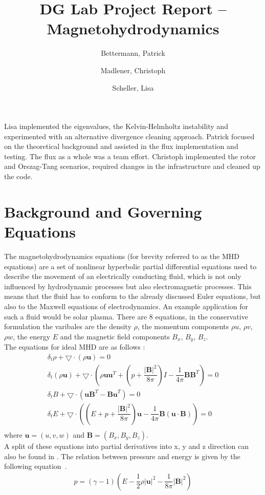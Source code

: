 \documentclass[a4paper]{article}
\author{
  Bettermann, Patrick
  \and
  Madlener, Christoph
  \and
  Scheller, Lisa
}
\title{DG Lab Project Report -- Magnetohydrodynamics}
\begin{document}
\maketitle

Lisa implemented the eigenvalues, the Kelvin-Helmholtz instability and
experimented with an alternative divergence cleaning approach. Patrick focused
on the theoretical background and assisted in the flux implementation and
testing. The flux as a whole was a team effort. Christoph implemented the rotor
and Orszag-Tang scenarios, required changes in the infrastructure and cleaned up
the code.

\section{Background and Governing Equations}
The magnetohydrodynamics equations (for brevity referred to as the MHD
equations) are a set of nonlinear hyperbolic partial differential equations used
to describe the movement of an electrically conducting fluid, which is not only
influenced by hydrodynamic processes but also electromagnetic processes. This
means that the fluid has to conform to the already discussed Euler equations,
but also to the Maxwell equations of electrodynamics. An example application for
such a fluid would be solar plasma. There are 8 equations, in the conservative
formulation the varibales are the density $\rho$, the momentum components $\rho
u$, $\rho v$, $\rho w$, the energy $E$ and the magnetic field components $B_x$,
$B_y$, $B_z$.\\
The equations for ideal MHD are as follows \cite{dedner2002hyperbolic}\cite{balsara2010multidimensional}:
\begin{align*}
\delta_t \rho + \bigtriangledown \cdot (\rho\textbf{u})= 0\\
\delta_t (\rho \textbf{u}) + \bigtriangledown \cdot (\rho     \textbf{u} \textbf{u}^T + (p + \dfrac{|\textbf{B}|^2}{8\pi})I - \dfrac{1}{4\pi}\textbf{B}\textbf{B}^T) = 0\\
\delta_t B + \bigtriangledown \cdot (\textbf{uB}^T-\textbf{Bu}^T) = 0\\
\delta_t E + \bigtriangledown \cdot ((E + p + \dfrac{|\textbf{B}|^2}{8\pi})\textbf{u} - \dfrac{1}{4\pi}\textbf{B}(\textbf{u} \cdot \textbf{B})) = 0\\
\end{align*}
where $\textbf{u} = (u, v, w)$ and $\textbf{B} = (B_x, B_y, B_z)$.\\
A split of these equations into partial derivatives into x, y and z direction can also be found in \cite{balsara2010multidimensional}.
The relation between pressure and energy is given by the following equation~\cite{dedner2002hyperbolic}.
\begin{align*}
p = (\gamma - 1)(E - \dfrac{1}{2}\rho |\textbf{u}|^2 - \dfrac{1}{8\pi} |\textbf{B}|^2)
\end{align*}
\end{document}
